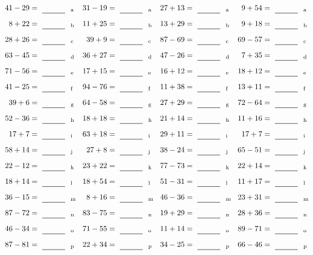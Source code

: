 \documentclass
[
  draft    = true,
  fontsize = 11pt,
  parskip  = half-
]
{scrartcl}
\begin{document}
\clearpage
\begin{align*}
    \pline{41-29}&=\rline{a}
  & \pline{31-19}&=\rline{a}
  & \pline{27+13}&=\rline{a}
  & \pline{9+54}&=\rline{a} \\[1ex]
    \pline{8+22}&=\rline{b}
  & \pline{11+25}&=\rline{b}
  & \pline{13+29}&=\rline{b}
  & \pline{9+18}&=\rline{b} \\[1ex]
    \pline{28+26}&=\rline{c}
  & \pline{39+9}&=\rline{c}
  & \pline{87-69}&=\rline{c}
  & \pline{69-57}&=\rline{c} \\[1ex]
    \pline{63-45}&=\rline{d}
  & \pline{36+27}&=\rline{d}
  & \pline{47-26}&=\rline{d}
  & \pline{7+35}&=\rline{d} \\[1ex]
    \pline{71-56}&=\rline{e}
  & \pline{17+15}&=\rline{e}
  & \pline{16+12}&=\rline{e}
  & \pline{18+12}&=\rline{e} \\[1ex]
    \pline{41-25}&=\rline{f}
  & \pline{94-76}&=\rline{f}
  & \pline{11+38}&=\rline{f}
  & \pline{13+11}&=\rline{f} \\[1ex]
    \pline{39+6}&=\rline{g}
  & \pline{64-58}&=\rline{g}
  & \pline{27+29}&=\rline{g}
  & \pline{72-64}&=\rline{g} \\[1ex]
    \pline{52-36}&=\rline{h}
  & \pline{18+18}&=\rline{h}
  & \pline{21+14}&=\rline{h}
  & \pline{11+16}&=\rline{h} \\[1ex]
    \pline{17+7}&=\rline{i}
  & \pline{63+18}&=\rline{i}
  & \pline{29+11}&=\rline{i}
  & \pline{17+7}&=\rline{i} \\[1ex]
    \pline{58+14}&=\rline{j}
  & \pline{27+8}&=\rline{j}
  & \pline{38-24}&=\rline{j}
  & \pline{65-51}&=\rline{j} \\[1ex]
    \pline{22-12}&=\rline{k}
  & \pline{23+22}&=\rline{k}
  & \pline{77-73}&=\rline{k}
  & \pline{22+14}&=\rline{k} \\[1ex]
    \pline{18+14}&=\rline{l}
  & \pline{18+54}&=\rline{l}
  & \pline{51-31}&=\rline{l}
  & \pline{11+17}&=\rline{l} \\[1ex]
    \pline{36-15}&=\rline{m}
  & \pline{8+16}&=\rline{m}
  & \pline{46-36}&=\rline{m}
  & \pline{23+31}&=\rline{m} \\[1ex]
    \pline{87-72}&=\rline{n}
  & \pline{83-75}&=\rline{n}
  & \pline{19+29}&=\rline{n}
  & \pline{28+36}&=\rline{n} \\[1ex]
    \pline{46-34}&=\rline{o}
  & \pline{71-55}&=\rline{o}
  & \pline{11+14}&=\rline{o}
  & \pline{89-71}&=\rline{o} \\[1ex]
    \pline{87-81}&=\rline{p}
  & \pline{22+34}&=\rline{p}
  & \pline{34-25}&=\rline{p}
  & \pline{66-46}&=\rline{p}
\end{align*}
\end{document}
